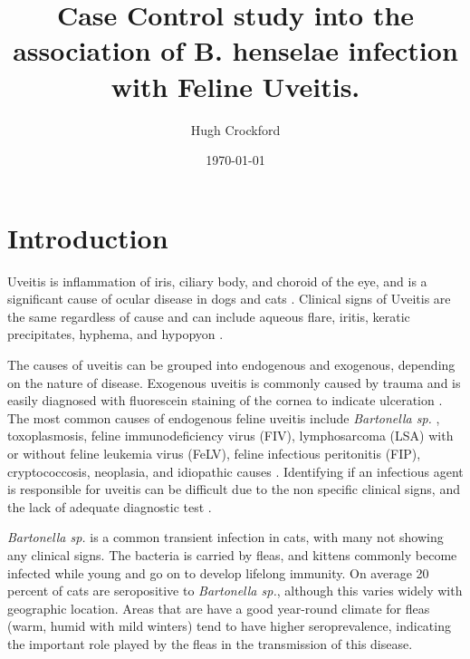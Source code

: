 \documentclass[11pt,twocolumn]{article}
\title{Case Control study into the association of B. henselae infection with Feline Uveitis.}
\author{Hugh Crockford}
\date{\today}
\begin{document}

	\section{Introduction}
		Uveitis is inflammation of iris, ciliary body, and choroid of the eye, and is a significant cause of ocular disease in dogs and cats \cite{Townsend2008}. 
		Clinical signs of Uveitis are the same regardless of cause and can include aqueous flare, iritis, keratic precipitates, hyphema, and hypopyon \cite{Powell2010}.


		The causes of uveitis can be grouped into endogenous and exogenous, depending on the nature of disease. Exogenous uveitis is commonly caused by trauma and is easily diagnosed with fluorescein staining of the cornea to indicate ulceration \cite{Fontenelle2008}.
		The most common causes of endogenous feline uveitis include \emph{Bartonella sp.} , toxoplasmosis, feline immunodeficiency virus (FIV), lymphosarcoma (LSA) with or without feline leukemia virus (FeLV), feline infectious peritonitis (FIP), cryptococcosis, neoplasia, and idiopathic causes \cite{Powell2001}.
		Identifying if an infectious agent is responsible for uveitis can be difficult due to the non specific clinical signs, and the lack of adequate diagnostic test \cite{Fontenelle2008}.


		\emph{Bartonella sp.} is a common transient infection in cats, with many not showing any clinical signs. 
		The bacteria is carried by fleas, and kittens commonly become infected while young and go on to develop lifelong immunity.
		On average 20 percent of cats are seropositive to \emph{Bartonella sp.}, although this varies widely with geographic location\cite{Jameson1995a}. Areas that are have a good year-round climate for fleas (warm, humid with mild winters) tend to have higher seroprevalence, indicating the important role played by the fleas in the transmission of this disease.
\end{document}
